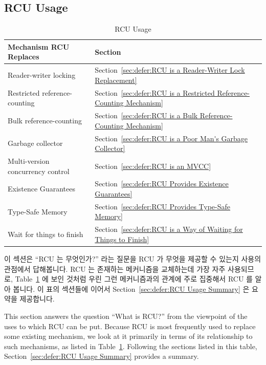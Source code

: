 
\subsection{RCU Usage}
\label{sec:defer:RCU Usage}

\begin{table}[tb]
\renewcommand*{\arraystretch}{1.2}
\centering
\small
\begin{tabular}{ll}
\toprule
Mechanism RCU Replaces & Section \\
\midrule
Reader-writer locking &
	Section~\ref{sec:defer:RCU is a Reader-Writer Lock Replacement} \\
Restricted reference-counting &
	Section~\ref{sec:defer:RCU is a Restricted Reference-Counting Mechanism} \\
Bulk reference-counting &
	Section~\ref{sec:defer:RCU is a Bulk Reference-Counting Mechanism} \\
Garbage collector &
	Section~\ref{sec:defer:RCU is a Poor Man's Garbage Collector} \\
Multi-version concurrency control &
	Section~\ref{sec:defer:RCU is an MVCC} \\
Existence Guarantees &
	Section~\ref{sec:defer:RCU Provides Existence Guarantees} \\
Type-Safe Memory &
	Section~\ref{sec:defer:RCU Provides Type-Safe Memory} \\
Wait for things to finish &
	Section~\ref{sec:defer:RCU is a Way of Waiting for Things to Finish} \\
\bottomrule
\end{tabular}
\caption{RCU Usage}
\label{tab:defer:RCU Usage}
\end{table}

이 섹션은 ``RCU 는 무엇인가?'' 라는 질문을 RCU 가 무엇을 제공할 수 있는지
사용의 관점에서 답해봅니다.
RCU 는 존재하는 메커니즘을 교체하는데 가장 자주 사용되므로,
Table~\ref{tab:defer:RCU Usage}
에 보인 것처럼 우린 그런 메커니즘과의 관계에 주로 집중해서 RCU 를 알아 봅니다.
이 표의 섹션들에 이어서
Section~\ref{sec:defer:RCU Usage Summary} 은 요약을 제공합니다.

\iffalse

This section answers the question ``What is RCU?'' from the viewpoint
of the uses to which RCU can be put.
Because RCU is most frequently used to replace some existing mechanism,
we look at it primarily in terms of its relationship to such mechanisms,
as listed in Table~\ref{tab:defer:RCU Usage}.
Following the sections listed in this table,
Section~\ref{sec:defer:RCU Usage Summary} provides a summary.

